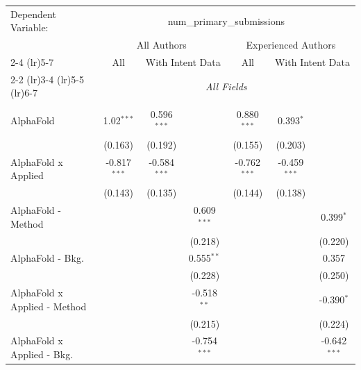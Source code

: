 \begingroup
\centering
\begin{tabular}{lcccccc}
   \tabularnewline \midrule \midrule
   Dependent Variable: & \multicolumn{6}{c}{num\_primary\_submissions}\\
 & \multicolumn{3}{c}{All Authors} & \multicolumn{3}{c}{Experienced Authors} \\
\cmidrule(lr){2-4} \cmidrule(lr){5-7}
 & \multicolumn{1}{c}{All} & \multicolumn{2}{c}{With Intent Data} & \multicolumn{1}{c}{All} & \multicolumn{2}{c}{With Intent Data} \\
\cmidrule(lr){2-2} \cmidrule(lr){3-4} \cmidrule(lr){5-5} \cmidrule(lr){6-7}
 & \multicolumn{6}{c}{\textit{All Fields}} \\ \\
   AlphaFold                      & 1.02$^{***}$   & 0.596$^{***}$  &                & 0.880$^{***}$  & 0.393$^{*}$    &   \\   
                                  & (0.163)        & (0.192)        &                & (0.155)        & (0.203)        &   \\   
   AlphaFold x Applied            & -0.817$^{***}$ & -0.584$^{***}$ &                & -0.762$^{***}$ & -0.459$^{***}$ &   \\   
                                  & (0.143)        & (0.135)        &                & (0.144)        & (0.138)        &   \\   
   AlphaFold - Method             &                &                & 0.609$^{***}$  &                &                & 0.399$^{*}$\\   
                                  &                &                & (0.218)        &                &                & (0.220)\\   
   AlphaFold - Bkg.               &                &                & 0.555$^{**}$   &                &                & 0.357\\   
                                  &                &                & (0.228)        &                &                & (0.250)\\   
   AlphaFold x Applied - Method   &                &                & -0.518$^{**}$  &                &                & -0.390$^{*}$\\   
                                  &                &                & (0.215)        &                &                & (0.224)\\   
   AlphaFold x Applied - Bkg.     &                &                & -0.754$^{***}$ &                &                & -0.642$^{***}$\\   

\end{tabular}
